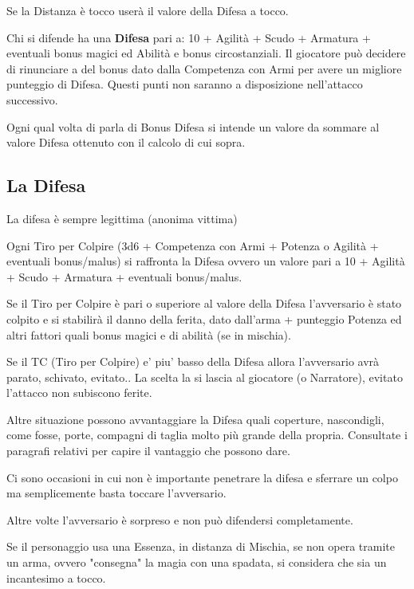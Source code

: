 \documentclass[a4paper,11pt,twoside,openany]{book}
\begin{document}
Se la Distanza è tocco userà il valore della Difesa a tocco.

Chi si difende ha una \textbf{Difesa} pari a: 10 + Agilità + Scudo + Armatura + eventuali bonus magici ed Abilità e bonus circostanziali.
Il giocatore può decidere di rinunciare a del bonus dato dalla Competenza con Armi per avere un migliore punteggio di Difesa. Questi punti non saranno a disposizione nell'attacco successivo.

Ogni qual volta di parla di Bonus Difesa si intende un valore da sommare al valore Difesa ottenuto con il calcolo di cui sopra.

\subsection{La Difesa}

\label{la-difesa}
\begin{tcolorbox}[enhanced,arc=5pt,boxrule=0.3pt]{La difesa è sempre legittima (anonima vittima)}\end{tcolorbox}\medskip

Ogni Tiro per Colpire (3d6 + Competenza con Armi + Potenza o Agilità + eventuali bonus/malus) si raffronta la Difesa ovvero un valore pari a 10 + Agilità + Scudo + Armatura + eventuali bonus/malus.

Se il Tiro per Colpire è pari o superiore al valore della Difesa l'avversario è stato colpito e si stabilirà il danno della ferita, dato dall'arma + punteggio Potenza ed altri fattori quali bonus magici e di abilità (se in mischia).

Se il TC (Tiro per Colpire) e' piu' basso della Difesa allora l'avversario avrà parato, schivato, evitato.. La scelta la si lascia al giocatore (o Narratore), evitato l'attacco non subiscono ferite.

Altre situazione possono avvantaggiare la Difesa quali coperture, nascondigli, come fosse, porte, compagni di taglia molto più grande della propria. Consultate i paragrafi relativi per capire il vantaggio che possono dare.

Ci sono occasioni in cui non è importante penetrare la difesa e sferrare un colpo ma semplicemente basta toccare l'avversario.

Altre volte l'avversario è sorpreso e non può difendersi completamente.

Se il personaggio usa una Essenza, in distanza di Mischia, se non opera tramite un arma, ovvero "consegna" la magia con una spadata, si considera che sia un incantesimo a tocco.
\end{document}
